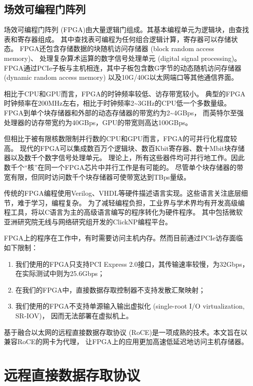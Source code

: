 \section{场效可编程门阵列}
场效可编程门阵列 (FPGA)由大量逻辑门组成。其基本编程单元为逻辑块，由查找表和寄存器组成。
其中查找表可编程为任何组合逻辑计算，寄存器可以存储状态。
FPGA还包含存储数据的块随机访问存储器 (block random access memory)、
处理复杂算术运算的数字信号处理单元 (digital signal processing)。
FPGA通过PCIe子板与主机相连，其中子板包含数G字节的动态随机访问存储器 (dynamic random access memory)
以及10G/40G以太网端口等其他通信界面。

相比于CPU和GPU而言，FPGA的时钟频率较低、访存带宽较小。
典型的FPGA时钟频率在200MHz左右，相比于时钟频率2\textasciitilde 3GHz的CPU低一个多数量级。
FPGA到单个块存储器和外部的动态存储器的带宽约为2\textasciitilde 4GBps，
而英特尔至强处理器的访存带宽约为40GBps，GPU的带宽则高达100GBps。

但相比于被有限核数限制并行数的CPU和GPU而言，FPGA的可并行化程度较高。
现代的FPGA可以集成数百万个逻辑块、数百Kbit寄存器、数十Mbit块存储器以及数千个数字信号处理单元。
理论上，所有这些器件均可并行地工作。因此数千个“核”在同一个FPGA芯片中并行工作是有可能的。
尽管单个块存储器的带宽有限，但同时访问数千个块存储器可使带宽达到TBps量级。

传统的FPGA编程使用Verilog、VHDL等硬件描述语言实现。这些语言关注底层细节，难于学习，编程复杂。
为了减轻编程负担，工业界与学术界均有开发高级编程工具，将以C语言为主的高级语言编写的程序转化为硬件程序。
其中包括微软亚洲研究院无线与网络研究组开发的ClickNP编程平台\cite{clicknp}。

FPGA上的程序在工作中，有时需要访问主机内存。然而目前通过PCIe访存面临如下限制：
\begin{enumerate}
\item 我们使用的FPGA只支持PCI Express 2.0\cite{pcie}接口，其传输速率较慢，为32Gbps，在实际测试中则为25.6Gbps；
\item 在我们的FPGA中，直接数据存取控制器不支持发散汇聚映射\cite{chapter3}；
\item 我们使用的FPGA不支持单源输入输出虚拟化 (single-root I/O virtualization, SR-IOV)\cite{irsov}，
因而无法部署在虚拟机上。
\end{enumerate}

基于融合以太网的远程直接数据存取协议 (RoCE)是一项成熟的技术。本文旨在以兼容RoCE的网卡为代理，
让FPGA上的应用更加高速低延迟地访问主机存储器。

\chapter{远程直接数据存取协议}
